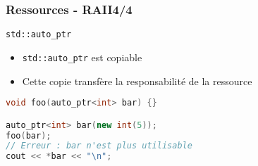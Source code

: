 \documentclass[C++.tex]{subfiles}
\begin{document}
\begin{frame}[fragile]
	\frametitle{Ressources - RAII\titlehfill{}4/4}
	\begin{alertblock}{\lstinline|std::auto_ptr|}
		\begin{itemize}
			\item \lstinline|std::auto_ptr| est copiable
			\item Cette copie transfère la responsabilité de la ressource
		\end{itemize}
	\end{alertblock}

	\begin{lstlisting}[language=C++]
void foo(auto_ptr<int> bar) {}

auto_ptr<int> bar(new int(5));
foo(bar);
// Erreur : bar n'est plus utilisable
cout << *bar << "\n";\end{lstlisting}


\end{frame}
\end{document}
